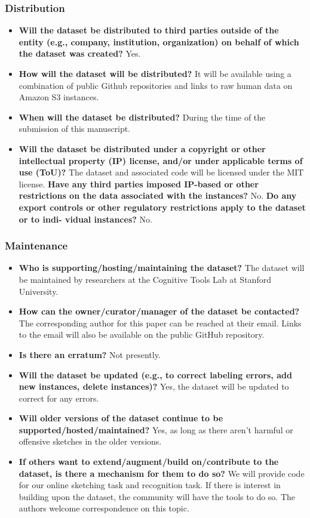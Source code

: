 \documentclass{article}
\begin{document}
\subsubsection{Distribution}
\begin{itemize}
    \item \textbf{Will the dataset be distributed to third parties outside of the entity (e.g., company, institution, organization) on behalf of which the dataset was created? } Yes.
    \item \textbf{How will the dataset will be distributed?} It will be available using a combination of public Github repositories and links to raw human data on Amazon S3 instances.
    \item \textbf{When will the dataset be distributed?} During the time of the submission of this manuscript.
    \item \textbf{Will the dataset be distributed under a copyright or other intellectual property (IP) license, and/or under applicable terms of use (ToU)? } The dataset and associated code will be licensed under the MIT license.
    \textbf{Have any third parties imposed IP-based or other restrictions on the data associated with the instances?} No.
    \textbf{Do any export controls or other regulatory restrictions apply to the dataset or to indi- vidual instances?} No.
\end{itemize}
\subsubsection{Maintenance}
\begin{itemize}
    \item \textbf{Who is supporting/hosting/maintaining the dataset?} The dataset will be maintained by researchers at the Cognitive Tools Lab at Stanford University.
    \item \textbf{How can the owner/curator/manager of the dataset be contacted?} The corresponding author for this paper can be reached at their email. Links to the email will also be available on the public GitHub repository.
    \item \textbf{Is there an erratum?} Not presently.
    \item \textbf{ Will the dataset be updated (e.g., to correct labeling errors, add new instances, delete instances)?} Yes, the dataset will be updated to correct for any errors.
    \item \textbf{Will older versions of the dataset continue to be supported/hosted/maintained?} Yes, as long as there aren't harmful or offensive sketches in the older versions.
    \item \textbf{If others want to extend/augment/build on/contribute to the dataset, is there a mechanism for them to do so? } We will provide code for our online sketching task and recognition task. If there is interest in building upon the dataset, the community will have the tools to do so. The authors welcome correspondence on this topic.
    
    
\end{itemize}
\end{document}
